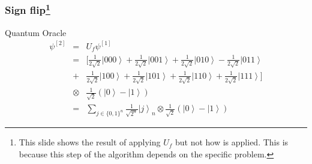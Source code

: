 \begin{frame}
	\frametitle{Sign flip\footnote{This slide shows the result of applying $U_f$ but not how is applied. This is because this step of the algorithm depends on the specific problem.}}
	\begin{exampleblock}{Quantum Oracle}
		\begin{eqnarray}		
		\psi^{[2]} &=& U_f\psi^{[1]} \nonumber\\
		&=&[\frac{1}{2\sqrt{2}}\left.|000\right\rangle +\frac{1}{2\sqrt{2}}\left.|001\right\rangle +\frac{1}{2\sqrt{2}}\left.|010\right\rangle -\frac{1}{2\sqrt{2}}\left.|011\right\rangle\nonumber\\ &+&\frac{1}{2\sqrt{2}}\left.|100\right\rangle +\frac{1}{2\sqrt{2}}\left.|101\right\rangle +\frac{1}{2\sqrt{2}}\left.|110\right\rangle +\frac{1}{2\sqrt{2}}\left.|111\right\rangle ]\nonumber\\
		&\otimes&\frac{1}{\sqrt{2}}\left(\left.|0\right\rangle -\left.|1\right\rangle \right)\nonumber\\
		&=&\sum_{j\in\{0,1\}^{n}}\frac{1}{\sqrt{2^{n}}}\left.|j\right\rangle _{n}\otimes\frac{1}{\sqrt{2}}\left(\left.|0\right\rangle -\left.|1\right\rangle \right)\nonumber
		\end{eqnarray}
	\end{exampleblock}
\end{frame}
